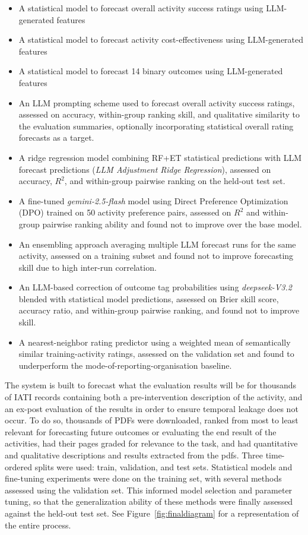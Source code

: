 \begin{itemize}
\item A statistical model to forecast overall activity success ratings using LLM-generated features
\item A statistical model to forecast activity cost-effectiveness using LLM-generated features
\item A statistical model to forecast 14 binary outcomes using LLM-generated features
\item An LLM prompting scheme used to forecast overall activity success ratings, assessed on accuracy, within-group ranking skill, and qualitative similarity to the evaluation summaries, optionally incorporating statistical overall rating forecasts as a target.
\item A ridge regression model combining RF+ET statistical predictions with LLM forecast predictions (\emph{LLM Adjustment Ridge Regression}), assessed on accuracy, $R^2$, and within-group pairwise ranking on the held-out test set.
\item A fine-tuned \emph{gemini-2.5-flash} model using Direct Preference Optimization (DPO) trained on 50 activity preference pairs, assessed on $R^2$ and within-group pairwise ranking ability and found not to improve over the base model.
\item An ensembling approach averaging multiple LLM forecast runs for the same activity, assessed on a training subset and found not to improve forecasting skill due to high inter-run correlation.
\item An LLM-based correction of outcome tag probabilities using \emph{deepseek-V3.2} blended with statistical model predictions, assessed on Brier skill score, accuracy ratio, and within-group pairwise ranking, and found not to improve skill.
\item A nearest-neighbor rating predictor using a weighted mean of semantically similar training-activity ratings, assessed on the validation set and found to underperform the mode-of-reporting-organisation baseline.
\end{itemize}

The system is built to forecast what the evaluation results will be for thousands of IATI records containing both a pre-intervention description of the activity, and an ex-post evaluation of the results in order to ensure temporal leakage does not occur. To do so, thousands of PDFs were downloaded, ranked from most to least relevant for forecasting future outcomes or evaluating the end result of the activities, had their pages graded for relevance to the task, and had quantitative and qualitative descriptions and results extracted from the pdfs. Three time-ordered splits were used: train, validation, and test sets. Statistical models and fine-tuning experiments were done on the training set, with several methods assessed using the validation set. This informed model selection and parameter tuning, so that the generalization ability of these methods were finally assessed against the held-out test set. See Figure~\ref{fig:finaldiagram} for a representation of the entire process.

